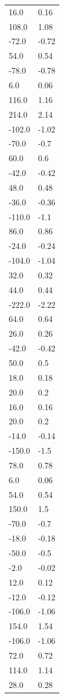 \begin{longtable}{ll}
16.0 & 0.16 \\
108.0 & 1.08 \\
-72.0 & -0.72 \\
54.0 & 0.54 \\
-78.0 & -0.78 \\
6.0 & 0.06 \\
116.0 & 1.16 \\
214.0 & 2.14 \\
-102.0 & -1.02 \\
-70.0 & -0.7 \\
60.0 & 0.6 \\
-42.0 & -0.42 \\
48.0 & 0.48 \\
-36.0 & -0.36 \\
-110.0 & -1.1 \\
86.0 & 0.86 \\
-24.0 & -0.24 \\
-104.0 & -1.04 \\
32.0 & 0.32 \\
44.0 & 0.44 \\
-222.0 & -2.22 \\
64.0 & 0.64 \\
26.0 & 0.26 \\
-42.0 & -0.42 \\
50.0 & 0.5 \\
18.0 & 0.18 \\
20.0 & 0.2 \\
16.0 & 0.16 \\
20.0 & 0.2 \\
-14.0 & -0.14 \\
-150.0 & -1.5 \\
78.0 & 0.78 \\
6.0 & 0.06 \\
54.0 & 0.54 \\
150.0 & 1.5 \\
-70.0 & -0.7 \\
-18.0 & -0.18 \\
-50.0 & -0.5 \\
-2.0 & -0.02 \\
12.0 & 0.12 \\
-12.0 & -0.12 \\
-106.0 & -1.06 \\
154.0 & 1.54 \\
-106.0 & -1.06 \\
72.0 & 0.72 \\
114.0 & 1.14 \\
28.0 & 0.28 \\

\end{longtable}
